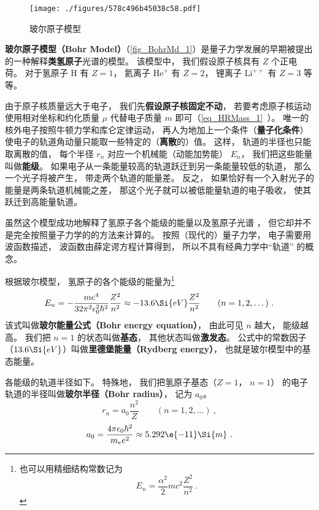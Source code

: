 

\begin{figure}[ht]
\centering
\texttt{[image: ./figures/578c496b45038c58.pdf]}
\caption{玻尔原子模型} \label{fig_BohrMd_1}
\end{figure}

\textbf{玻尔原子模型（Bohr Model）}（\autoref{fig_BohrMd_1}）是量子力学发展的早期被提出的一种解释\textbf{类氢原子}光谱的模型。 该模型中， 我们假设原子核具有 $Z$ 个正电荷。 对于氢原子 $\mathrm{H}$ 有 $Z = 1$， 氦离子 $\mathrm{He}^+$ 有 $Z = 2$， 锂离子 $\mathrm{Li}^{++}$ 有 $Z = 3$ 等等。

由于原子核质量远大于电子， 我们先\textbf{假设原子核固定不动}， 若要考虑原子核运动使用相对坐标和约化质量 $\mu$ 代替电子质量 $m$ 即可（\autoref{eq_HRMass_1}~）。
唯一的核外电子按照牛顿力学和库仑定律运动， 再人为地加上一个条件（\textbf{量子化条件}）使电子的轨道角动量只能取一些特定的（\textbf{离散}的）值。 这样， 轨道的半径也只能取离散的值， 每个半径 $r_n$ 对应一个机械能（动能加势能） $E_n$， 我们把这些能量叫做\textbf{能级}。 如果电子从一条能量较高的轨道跃迁到另一条能量较低的轨道， 那么一个光子将被产生， 带走两个轨道的能量差。 反之， 如果恰好有一个入射光子的能量是两条轨道机械能之差， 那这个光子就可以被低能量轨道的电子吸收， 使其跃迁到高能量轨道。

虽然这个模型成功地解释了氢原子各个能级的能量以及氢原子光谱%
， 但它却并不是完全按照量子力学的的方法来计算的。 按照（现代的）量子力学， 电子需要用波函数描述， 波函数由薛定谔方程计算得到， 所以不具有经典力学中“轨道” 的概念。

根据玻尔模型， 氢原子的各个能级的能量为\footnote{也可以用精细结构常数记为
\begin{equation}
E_n = \frac{\alpha^2}{2}mc^2 \frac{Z^2}{n^2}~.
\end{equation}}
\begin{equation}
E_n =  - \frac{m e^4}{32 \pi^2 \epsilon_0^2 \hbar ^2} \frac{Z^2}{n^2} \approx - 13.6\Si{eV} \frac{Z^2}{n^2}
\qquad (n = 1, 2, \dots)~.
\end{equation}
该式叫做\textbf{玻尔能量公式（Bohr energy equation）}， 由此可见 $n$ 越大， 能级越高。 我们把 $n = 1$ 的状态叫做\textbf{基态}， 其他状态叫做\textbf{激发态}。 公式中的常数因子（$13.6\Si{eV}$）叫做\textbf{里德堡能量（Rydberg energy）}， 也就是玻尔模型中的基态能量。

各能级的轨道半径如下。 特殊地， 我们把氢原子基态（$Z = 1$， $n = 1$） 的电子轨道的半径叫做\textbf{玻尔半径（Bohr radius）}， 记为 $a_0$。
\begin{equation}\label{eq_BohrMd_1}
r_n = a_0 \frac{n^2}{Z}
\qquad (n = 1, 2, \dots)~,
\end{equation}
\begin{equation}\label{eq_BohrMd_3}
a_0 = \frac{4\pi \epsilon_0 \hbar^2}{m_e e^2} \approx 5.292\e{-11}\Si{m}~.
\end{equation}


